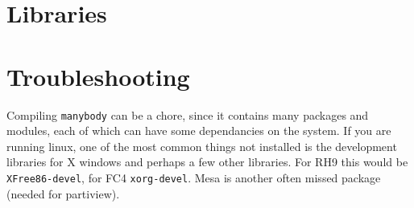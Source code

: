 \chapter                {Libraries}


\chapter                {Troubleshooting}

Compiling {\tt manybody} can be a chore, since it contains many packages
and modules, each of which can have some dependancies on the system.
If you are running linux, one of the most common things not installed
is the development libraries for X windows and perhaps a few other libraries.
For RH9 this would be {\tt  XFree86-devel}, for FC4 {\tt xorg-devel}.
Mesa is another often missed package (needed for partiview).

